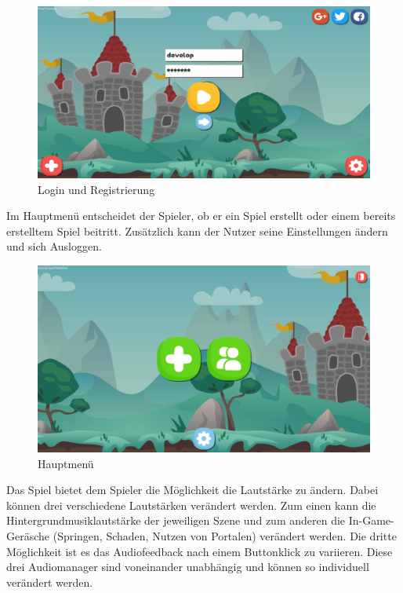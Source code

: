 \begin{figure}[H]
    \begin{center}
      \includegraphics[width=\linewidth]{img/realisierung/Login}
      \caption{Login und Registrierung}
      \label{fig:realisierung:realisierung:login}
    \end{center}
\end{figure}

Im Hauptmenü entscheidet der Spieler, ob er ein Spiel erstellt oder einem bereits erstelltem Spiel beitritt. Zusätzlich kann der Nutzer seine Einstellungen ändern und sich Ausloggen.

\begin{figure}[H]
    \begin{center}
      \includegraphics[width=\linewidth]{img/realisierung/menu}
      \caption{Hauptmenü}
      \label{fig:realisierung:realisierung:hauptmenu}
    \end{center}
\end{figure}

Das Spiel bietet dem Spieler die Möglichkeit die Lautstärke zu ändern. Dabei können drei verschiedene Lautstärken verändert werden. Zum einen kann die Hintergrundmusiklautstärke der jeweiligen Szene und zum anderen die In-Game-Geräsche (Springen, Schaden, Nutzen von Portalen) verändert werden. Die dritte Möglichkeit ist es das Audiofeedback nach einem Buttonklick zu variieren. Diese drei Audiomanager sind voneinander unabhängig und können so individuell verändert werden.

